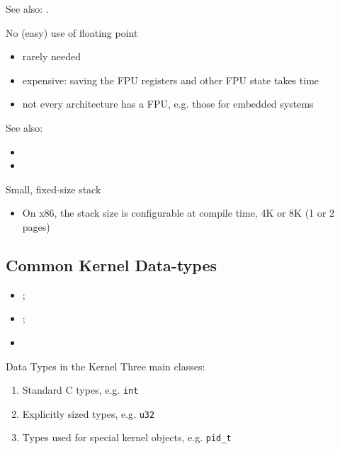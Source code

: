 See also: .

\begin{frame}
  \begin{block}{No (easy) use of floating point}
    \begin{itemize}
    \item rarely needed
    \item expensive: saving the FPU registers and other FPU state takes time
    \item not every architecture has a FPU, e.g. those for embedded systems
    \end{itemize}
  \end{block}
\end{frame}

See also:
\begin{itemize}
\item {}
\item {}
\end{itemize}

\begin{frame}
  \begin{block}{Small, fixed-size stack}
    \begin{itemize}
    \item On x86, the stack size is configurable at compile time, 4K or 8K (1 or 2 pages)
    \end{itemize}
  \end{block}
\end{frame}

\subsection{Common Kernel Data-types}

\begin{itemize}
\item {};
\item {}; 
\item {}
\end{itemize}

\begin{frame}{Data Types in the Kernel}
  Three main classes:
  \begin{enumerate}
  \item Standard C types, e.g. \texttt{int}
  \item Explicitly sized types, e.g. \texttt{u32}
  \item Types used for special kernel objects, e.g. \texttt{pid\_t}
  \end{enumerate}
\end{frame}

